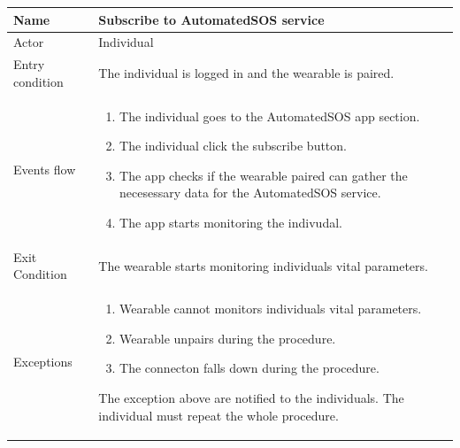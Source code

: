 \begin{tabular}{|l|p{11cm}|}
    \hline
    Name & Subscribe to AutomatedSOS service
    \\ \hline
    Actor & Individual
    \\ \hline 
    Entry condition & The individual is logged in and the wearable is paired.
        \\ \hline
    Events flow &
    \begin{enumerate}
	\item The individual goes to the AutomatedSOS app section.
    \item The individual click the subscribe button.
    \item The app checks if the wearable paired can gather the necesessary data for the AutomatedSOS service.
    \item The app starts monitoring the indivudal.
    \end{enumerate}
     \\ \hline
     Exit Condition & The wearable starts monitoring individuals vital parameters.
     \\
    \hline
    Exceptions &
        \begin{enumerate}
    \item Wearable cannot monitors individuals vital parameters.
    \item Wearable unpairs during the procedure.
    \item The connecton falls down during the procedure.
    \end{enumerate}
      The exception above are notified to the individuals. The individual must repeat the whole 
      procedure.
      \\
    \hline
\end{tabular}





